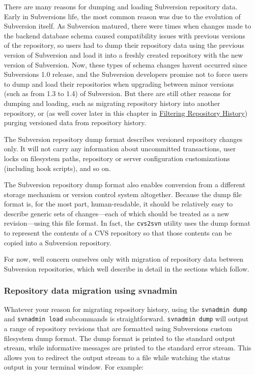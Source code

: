 There are many reasons for dumping and loading Subversion repository
data. Early in Subversion\textquotesingle s life, the most common reason
was due to the evolution of Subversion itself. As Subversion matured,
there were times when changes made to the backend database schema caused
compatibility issues with previous versions of the repository, so users
had to dump their repository data using the previous version of
Subversion and load it into a freshly created repository with the new
version of Subversion. Now, these types of schema changes
haven\textquotesingle t occurred since Subversion\textquotesingle s 1.0
release, and the Subversion developers promise not to force users to
dump and load their repositories when upgrading between minor versions
(such as from 1.3 to 1.4) of Subversion. But there are still other
reasons for dumping and loading, such as migrating repository history
into another repository, or (as we\textquotesingle ll cover later
in this chapter in \hyperref[svn.reposadmin.maint.filtering]{Filtering
Repository History}) purging versioned data from repository history.

The Subversion repository dump format describes versioned repository
changes only. It will not carry any information about uncommitted
transactions, user locks on filesystem paths, repository or server
configuration customizations (including hook scripts), and so on.

The Subversion repository dump format also enables conversion from a
different storage mechanism or version control system altogether.
Because the dump file format is, for the most part, human-readable, it
should be relatively easy to describe generic sets of changes---each of
which should be treated as a new revision---using this file format. In
fact, the \texttt{cvs2svn} utility uses the dump format to represent the
contents of a CVS repository so that those contents can be copied into a
Subversion repository.

For now, we\textquotesingle ll concern ourselves only with migration of
repository data between Subversion repositories, which
we\textquotesingle ll describe in detail in the sections which follow.

\subsubsection{Repository data migration using
svnadmin}\label{svn.reposadmin.maint.migrate.svnadmin}

Whatever your reason for migrating repository history, using the
\texttt{svnadmin\ dump} and \texttt{svnadmin\ load} subcommands is
straightforward. \texttt{svnadmin\ dump} will output a range of
repository revisions that are formatted using
Subversion\textquotesingle s custom filesystem dump format. The dump
format is printed to the standard output stream, while informative
messages are printed to the standard error stream. This allows you to
redirect the output stream to a file while watching the status output in
your terminal window. For example:

